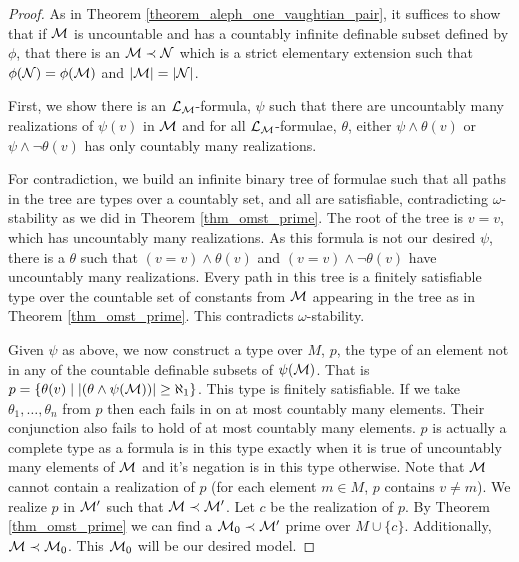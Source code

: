\begin{proof}
As in Theorem \ref{theorem_aleph_one_vaughtian_pair}, it suffices to show that if \(\mathcal{M}\) is uncountable and has a countably infinite definable subset defined by \(\phi\), that there is an \(\mathcal{M} \prec \mathcal{N}\) which is a strict elementary extension such that \(\phi(\mathcal{N}) = \phi(\mathcal{M})\) and \(|\mathcal{M}| = |\mathcal{N}|\).

First, we show there is an \(\mathcal{L}_{\mathcal{M}}\)-formula, \(\psi\) such that there are uncountably many realizations of \(\psi(v)\) in \(\mathcal{M}\) and for all \(\mathcal{L}_{\mathcal{M}}\)-formulae, \(\theta\), either \(\psi \land \theta(v)\) or \(\psi \land \neg\theta(v)\) has only countably many realizations. 

For contradiction, we build an infinite binary tree of formulae such that all paths in the tree are types over a countably set, and all are satisfiable, contradicting \(\omega\)-stability as we did in Theorem \ref{thm_omst_prime}.  
The root of the tree is \(v = v\), which has uncountably many realizations. 
As this formula is not our desired \(\psi\), there is a \(\theta\) such that \((v = v) \land \theta(v)\) and \((v = v) \land \neg \theta(v)\) have uncountably many realizations. 
Every path in this tree is a finitely satisfiable type over the countable set of constants from \(\mathcal{M}\) appearing in the tree as in
Theorem \ref{thm_omst_prime}.
This contradicts \(\omega\)-stability. 

Given \(\psi\) as above, we now construct a type over \(M\), \(p\), the type of an element not in any of the countable definable subsets of \(\psi(\mathcal{M})\). 
That is \(p = \{\theta(v) \mid |(\theta \land \psi (\mathcal{M}))| \geq \aleph_1\}\).
This type is finitely satisfiable. If we take \(\theta_1, \ldots, \theta_n\) from \(p\) then each fails in on at most countably many elements. 
Their conjunction also fails to hold of at most countably many elements. 
\(p\) is actually a complete type as a formula is in this type  exactly when it is true of uncountably many elements of \(\mathcal{M}\) and it's negation is in this type otherwise. 
Note that \(\mathcal{M}\) cannot contain a realization of \(p\) (for each element \(m \in M\), \(p\) contains \(v \neq m\)). 
We realize \(p\) in \(\mathcal{M}'\) such that \(\mathcal{M} \prec \mathcal{M}'\). 
Let \(c\) be the realization of \(p\). 
By Theorem \ref{thm_omst_prime} we can find a \(\mathcal{M}_0 \prec \mathcal{M}'\) prime over \(M \cup \{c\}\). 
Additionally, \(\mathcal{M} \prec \mathcal{M}_0\). 
This \(\mathcal{M}_0\) will be our desired model. 


\end{proof}
